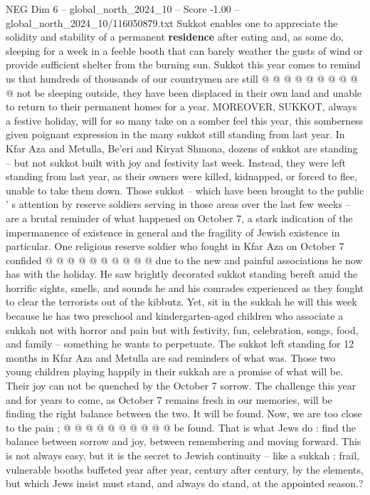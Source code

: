 \begin{textsample}{NEG Dim 6 – global\_north\_2024\_10 – Score -1.00 – global\_north\_2024\_10/116050879.txt}
Sukkot enables one to appreciate the solidity and stability of a permanent \textbf{residence} after eating and, as some do, sleeping for a week in a feeble booth that can barely weather the gusts of wind or provide sufficient shelter from the burning sun.
Sukkot this year comes to remind us that hundreds of thousands of our countrymen are still @ @ @ @ @ @ @ @ @ @ not be sleeping outside, they have been displaced in their own land and unable to return to their permanent homes for a year.
MOREOVER, SUKKOT, always a festive holiday, will for so many take on a somber feel this year, this somberness given poignant expression in the many sukkot still standing from last year.
In Kfar Aza and Metulla, Be'eri and Kiryat Shmona, dozens of sukkot are standing -- but not sukkot built with joy and festivity last week.
Instead, they were left standing from last year, as their owners were killed, kidnapped, or forced to flee, unable to take them down.
Those sukkot -- which have been brought to the public ' s attention by reserve soldiers serving in those areas over the last few weeks -- are a brutal reminder of what happened on October 7, a stark indication of the impermanence of existence in general and the fragility of Jewish existence in particular.
One religious reserve soldier who fought in Kfar Aza on October 7 confided @ @ @ @ @ @ @ @ @ @ due to the new and painful associations he now has with the holiday.
He saw brightly decorated sukkot standing bereft amid the horrific sights, smells, and sounds he and his comrades experienced as they fought to clear the terrorists out of the kibbutz.
Yet, sit in the sukkah he will this week because he has two preschool and kindergarten-aged children who associate a sukkah not with horror and pain but with festivity, fun, celebration, songs, food, and family -- something he wants to perpetuate.
The sukkot left standing for 12 months in Kfar Aza and Metulla are sad reminders of what was.
Those two young children playing happily in their sukkah are a promise of what will be.
Their joy can not be quenched by the October 7 sorrow.
The challenge this year and for years to come, as October 7 remains fresh in our memories, will be finding the right balance between the two.
It will be found.
Now, we are too close to the pain ; @ @ @ @ @ @ @ @ @ @ be found.
That is what Jews do : find the balance between sorrow and joy, between remembering and moving forward.
This is not always easy, but it is the secret to Jewish continuity -- like a sukkah : frail, vulnerable booths buffeted year after year, century after century, by the elements, but which Jews insist must stand, and always do stand, at the appointed season.?

\end{textsample}
